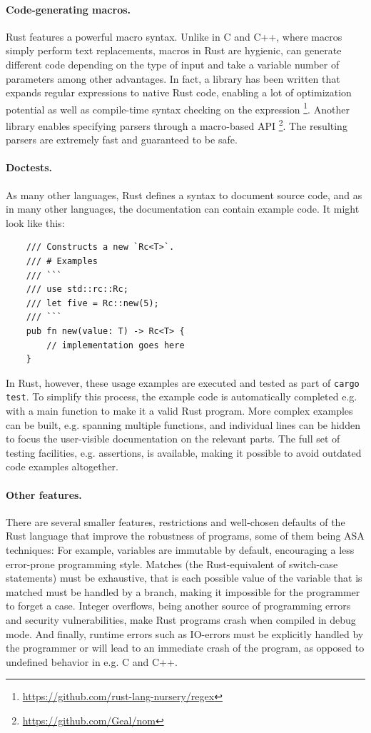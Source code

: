 \documentclass{scrartcl}
\begin{document}
\paragraph{Code-generating macros.} Rust features a powerful macro syntax. Unlike in C and C++, where macros simply perform text replacements, macros in Rust are hygienic, can generate different code depending on the type of input and take a variable number of parameters among other advantages. In fact, a library has been written that expands regular expressions to native Rust code, enabling a lot of optimization potential as well as compile-time syntax checking on the expression \footnote{\url{https://github.com/rust-lang-nursery/regex}}. Another library enables specifying parsers through a macro-based API \footnote{\url{https://github.com/Geal/nom}}. The resulting parsers are extremely fast and guaranteed to be safe.

\paragraph{Doctests.} As many other languages, Rust defines a syntax to document source code, and as in many other languages, the documentation can contain example code. It might look like this:

\small {
    \begin{verbatim}
    /// Constructs a new `Rc<T>`.
    /// # Examples
    /// ```
    /// use std::rc::Rc;
    /// let five = Rc::new(5);
    /// ```
    pub fn new(value: T) -> Rc<T> {
        // implementation goes here
    }
    \end{verbatim}
}

In Rust, however, these usage examples are executed and tested as part of \texttt{cargo test}. To simplify this process, the example code is automatically completed e.g. with a main function to make it a valid Rust program. More complex examples can be built, e.g. spanning multiple functions, and individual lines can be hidden to focus the user-visible documentation on the relevant parts. The full set of testing facilities, e.g. assertions, is available, making it possible to avoid outdated code examples altogether.

\paragraph{Other features.} There are several smaller features, restrictions and well-chosen defaults of the Rust language that improve the robustness of programs, some of them being ASA techniques: For example, variables are immutable by default, encouraging a less error-prone programming style. Matches (the Rust-equivalent of switch-case statements) must be exhaustive, that is each possible value of the variable that is matched must be handled by a branch, making it impossible for the programmer to forget a case. Integer overflows, being another source of programming errors and security vulnerabilities, make Rust programs crash when compiled in debug mode. And finally, runtime errors such as IO-errors must be explicitly handled by the programmer or will lead to an immediate crash of the program, as opposed to undefined behavior in e.g. C and C++.
\end{document}

